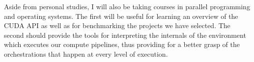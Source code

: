 \documentclass[conference, onecolumn]{IEEEtran}
\begin{document}
Aside from personal studies, I will also be taking courses in parallel
programming and operating systems.
The first will be useful for learning an overview of the CUDA API as well as
for benchmarking the projects we have selected.
The second should provide the tools for interpreting the internals of the
environment which executes our compute pipelines, thus providing for a better
grasp of the orchestrations that happen at every level of execution.



\end{document}
